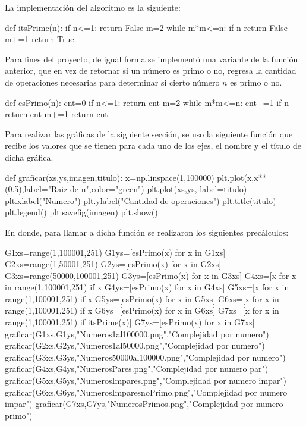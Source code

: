 La implementaci\'on del algoritmo es la siguiente:
\begin{python}
def itsPrime(n):
    if n<=1:
        return False
    m=2
    while m*m<=n:
        if n%
            return False
        m+=1
    return True
\end{python}

Para fines del proyecto, de igual forma se implement\'o una variante de la funci\'on anterior, que en vez de retornar si un n\'umero es primo o no, regresa la cantidad de operaciones necesarias para determinar si cierto n\'umero $n$ es primo o no. 

\begin{python}
def esPrimo(n):
    cnt=0
    if n<=1:
        return cnt
    m=2
    while m*m<=n:
        cnt+=1
        if n%
            return cnt
        m+=1
    return cnt
\end{python}

Para realizar las gr\'aficas de la siguiente secci\'on, se uso la siguiente funci\'on que recibe los valores que se tienen para cada uno de los ejes, el nombre y el t\'itulo de dicha gr\'afica. 
\begin{python}
def graficar(xs,ys,imagen,titulo):
    x=np.linspace(1,100000)
    plt.plot(x,x**(0.5),label="Raiz de n",color="green")
    plt.plot(xs,ys, label=titulo)
    plt.xlabel("Numero")
    plt.ylabel("Cantidad de operaciones")
    plt.title(titulo) 
    plt.legend()
    plt.savefig(imagen)
    plt.show()
\end{python}
En donde, para llamar a dicha funci\'on se realizaron los siguientes prec\'alculos:
\begin{python}
G1xs=range(1,100001,251)
G1ys=[esPrimo(x) for x in G1xs]
G2xs=range(1,50001,251)
G2ys=[esPrimo(x) for x in G2xs]
G3xs=range(50000,100001,251)
G3ys=[esPrimo(x) for x in G3xs]
G4xs=[x for x in range(1,100001,251) if x%
G4ys=[esPrimo(x) for x in G4xs]
G5xs=[x for x in range(1,100001,251) if x%
G5ys=[esPrimo(x) for x in G5xs]
G6xs=[x for x in range(1,100001,251) if x%
G6ys=[esPrimo(x) for x in G6xs]
G7xs=[x for x in range(1,100001,251) if itsPrime(x)]
G7ys=[esPrimo(x) for x in G7xs]
graficar(G1xs,G1ys,"Numeros1al100000.png","Complejidad por numero")
graficar(G2xs,G2ys,"Numeros1al50000.png","Complejidad por numero")
graficar(G3xs,G3ys,"Numeros50000al100000.png","Complejidad por numero")
graficar(G4xs,G4ys,"NumerosPares.png","Complejidad por numero par")
graficar(G5xs,G5ys,"NumerosImpares.png","Complejidad por numero impar")
graficar(G6xs,G6ys,"NumerosImparesnoPrimo.png","Complejidad por numero impar")
graficar(G7xs,G7ys,"NumerosPrimos.png","Complejidad por numero primo")
\end{python}

